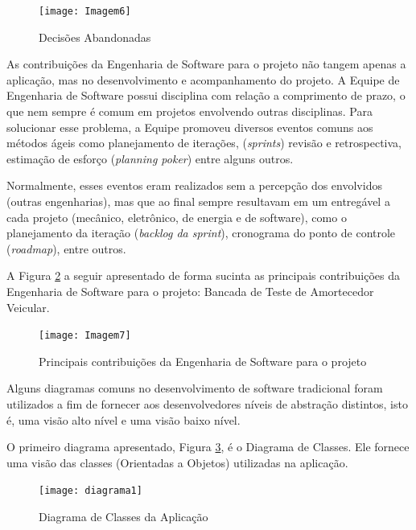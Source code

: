 		\begin{figure}[htpb]
			\centering
			\texttt{[image: Imagem6]}
			\caption{Decisões Abandonadas}
			\label{Imagem6}
		\end{figure}

	\newpage

		As contribuições da Engenharia de Software para o projeto não tangem apenas a aplicação, mas no desenvolvimento e acompanhamento do projeto. A Equipe de Engenharia de Software possui disciplina com relação a comprimento de prazo, o que nem sempre é comum em projetos envolvendo outras disciplinas. Para solucionar esse problema, a Equipe promoveu diversos eventos comuns aos métodos ágeis como planejamento de iterações, (\textit{sprints}) revisão e retrospectiva, estimação de esforço (\textit{planning poker}) entre alguns outros.
		
		Normalmente, esses eventos eram realizados sem a percepção dos envolvidos (outras engenharias), mas que ao final sempre resultavam em um entregável a cada projeto (mecânico, eletrônico, de energia e de software), como o planejamento da iteração (\textit{backlog da sprint}), cronograma do ponto de controle (\textit{roadmap}), entre outros.
		
		A Figura \ref{Imagem7} a seguir apresentado de forma sucinta as principais contribuições da Engenharia de Software para o projeto: Bancada de Teste de Amortecedor Veicular.

		\begin{figure}[htpb]
			\centering
			\texttt{[image: Imagem7]}
			\caption{Principais contribuições da Engenharia de Software para o projeto}
			\label{Imagem7}
		\end{figure}


		Alguns diagramas comuns no desenvolvimento de software tradicional foram utilizados a fim de fornecer aos desenvolvedores níveis de abstração distintos, isto é, uma visão alto nível e uma visão baixo nível. 
		
		O primeiro diagrama apresentado, Figura \ref{diagrama1}, é o Diagrama de Classes. Ele fornece uma visão das classes (Orientadas a Objetos) utilizadas na aplicação.

		\begin{figure}[htpb]
			\centering
			\texttt{[image: diagrama1]}
			\caption{Diagrama de Classes da Aplicação}
			\label{diagrama1}
		\end{figure}

